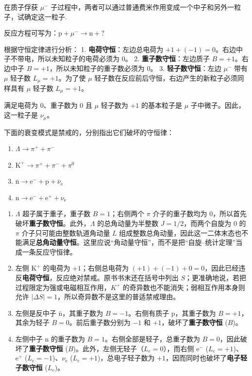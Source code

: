 \begin{exercise}\label{ex:30.4}
在质子俘获 $\mu^-$ 子过程中，两者可以通过普通费米作用变成一个中子和另外一粒子，试确定这一粒子.
\end{exercise}
\begin{solution}
反应方程可写为：$\mathrm{p} + \mu^- \rightarrow \mathrm{n} + ?$

根据守恒定律进行分析：
1. \textbf{电荷守恒}：左边总电荷为 $+1 + (-1) = 0$。右边中子不带电，所以未知粒子的电荷必须为 $0$。
2. \textbf{重子数守恒}：左边质子 $B = +1$。右边中子 $B = +1$，所以未知粒子的重子数必须为 $0$。
3. \textbf{轻子数守恒}：左边 $\mu^-$ 带有 $\mu$ 轻子数 $L_\mu = +1$。为了使 $\mu$ 轻子数在反应前后守恒，右边产生的新粒子必须同样具有 $\mu$ 轻子数 $L_\mu = +1$。

满足电荷为 $0$、重子数为 $0$ 且 $\mu$ 轻子数为 $+1$ 的基本粒子是 $\mu$ 子中微子。因此，这一粒子是 $\nu_\mu$。
\end{solution}

\begin{exercise}\label{ex:30.5}
下面的衰变模式是禁戒的，分别指出它们破坏的守恒律：
\begin{enumerate}
  \item[(a)] $\Lambda \rightarrow \pi^+ + \pi^-$
  \item[(b)] $\mathrm{K}^+ \rightarrow \pi^+ + \pi^- + \pi^0$
  \item[(c)] $\bar{\mathrm{n}} \rightarrow \mathrm{e}^- + \mathrm{p} + \bar{\nu}_{\mathrm{e}}$
  \item[(d)] $\mathrm{n} \rightarrow \mathrm{e}^- + \mathrm{e}^+ + \nu_{\mathrm{e}}$
\end{enumerate}
\end{exercise}
\begin{solution}
\begin{enumerate}
    \item[(a)] $\Lambda$ 超子属于重子，重子数 $B=1$；右侧两个 $\pi$ 介子的重子数均为 $0$，所以首先破坏\textbf{重子数守恒}。此外，$\Lambda$ 的总角动量为半整数 $J=1/2$，而两个自旋为 $0$ 的 $\pi$ 介子只可能由整数轨道角动量 $L$ 组成整数总角动量，因此这一二体末态也不能满足\textbf{总角动量守恒}。这里应说“角动量守恒”，而不是把“自旋--统计定理”当成一条反应守恒律。
    \item[(b)] 左侧 $\mathrm{K}^+$ 的电荷为 $+1$；右侧总电荷为 $(+1)+(-1)+0=0$，因此已经违反\textbf{电荷守恒}，反应绝对禁戒。原书书末还在括号中列出 $S$；更准确地说，若把过程限定为强或电磁相互作用，$K^+$ 的奇异数也不能消失；弱相互作用本身则允许 $|\Delta S|=1$，所以奇异数不是这里的普适禁戒理由。
    \item[(c)] 左侧是反中子 $\bar{\mathrm{n}}$，其重子数为 $B = -1$。右侧有质子 $\mathrm{p}$，其重子数为 $B = +1$，其余为轻子 $B = 0$。前后重子数分别为 $-1$ 和 $+1$，破坏了\textbf{重子数守恒} ($B$)。
    \item[(d)] 左侧中子 $\mathrm{n}$ 的重子数为 $B = 1$。右侧全部是轻子，总重子数为 $B = 0$，因此破坏了\textbf{重子数守恒} ($B$)。此外，左侧无轻子（$L_e = 0$），而右侧 $\mathrm{e}^-$ ($L_e=+1$)、$\mathrm{e}^+$ ($L_e=-1$)、$\nu_{\mathrm{e}}$ ($L_e=+1$)，总电子轻子数为 $+1$，因而同时也破坏了\textbf{电子轻子数守恒} ($L_e$)。
\end{enumerate}
\end{solution}

